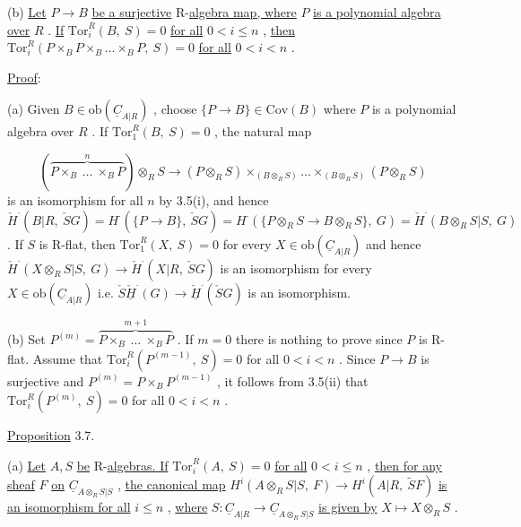 (b)  \underline{Let}  $P \to B$  \underline{be a surjective} R-\underline{algebra map, where}  $P$  \underline{is a polynomial algebra over}  $R$  . \underline{If}  $\mathrm{Tor}^R_i(B,\ S) = 0$  \underline{for all}  $0 < i \leq n$  , \underline{then} $\mathrm{Tor}^R_i(P\times_B P\times_B \ldots \times_B P,\ S) = 0$  \underline{for all}  $0 < i < n$  .


\underline{Proof}:

(a)  Given  $B \in \mathrm{ob}(\underline{C}_{A|R})$  , choose  $\{P \to B\} \in \mathrm{Cov}(B)$  where  $P$  is a polynomial algebra over  $R$  . If  $\mathrm{Tor}^R_1(B,\ S) = 0$  , the natural map

\begin{equation*}
(\overbrace{P\times_B \ \ldots\ \times_B P}^{\,n\,})\otimes_R S \to (P\otimes_R S)\times_{(B\otimes_R S)} \ldots \times_{(B\otimes_R S)} (P\otimes_R S)
\end{equation*}
is an isomorphism for all  $n$  by 3.5(i), and hence  $\check{H}^{\cdot}(B|R,\ \check{S}G) = H^{\cdot}(\{P \to B\},\ \check{S}G) = H^{\cdot}(\{P\otimes_R S \to B\otimes_R S\},\ G) = \check{H}^{\cdot}(B\otimes_R S|S,\ G)$  . If  $S$  is R-flat, then  $\mathrm{Tor}^R_1(X,\ S) = 0$  for every  $X \in \mathrm{ob}(\underline{C}_{A|R})$  and hence $\check{H}^{\cdot}(X\otimes_R S|S,\ G) \to \check{H}^{\cdot}(X|R,\ \check{S}G)$  is an isomorphism for every  $X \in \mathrm{ob}(\underline{C}_{A|R})$  i.e. $\check{S}\underline{\check{H}}^{\cdot}(G) \to \underline{\check{H}}^{\cdot}(\check{S}G)$  is an isomorphism.

(b)  Set  $P^{(m)} = \overbrace{P\times_B \ \ldots\ \times_B P}^{\,m+1\,}$  . If  $m = 0$  there is nothing to prove since  $P$  is R-flat. Assume that  $\mathrm{Tor}^R_i(P^{(m-1)},\ S) = 0$  for all  $0 < i < n$  . Since  $P \to B$  is surjective and  $P^{(m)} = P\times_B P^{(m-1)}$  , it follows from 3.5(ii) that $\mathrm{Tor}^R_i(P^{(m)},\ S) = 0$  for all  $0 < i < n$  .




\underline{Proposition} 3.7.

(a)  \underline{Let}  $A, S$  \underline{be} R-\underline{algebras. If}  $\mathrm{Tor}^R_i(A,\ S) = 0$  \underline{for all}  $0 < i \leq n$  , \underline{then for any sheaf}  $F$  \underline{on}  $\underline{C}_{A\otimes_R S|S}$  , \underline{the canonical map}  $H^i(A\otimes_R S|S,\ F) \to H^i(A|R,\ \widetilde{S}F)$ \underline{is an isomorphism for all}  $i \leq n$  , \underline{where}  $S : \underline{C}_{A|R} \to \underline{C}_{A\otimes_R S|S}$  \underline{is given by} $X \longmapsto X\otimes_R S$  .

